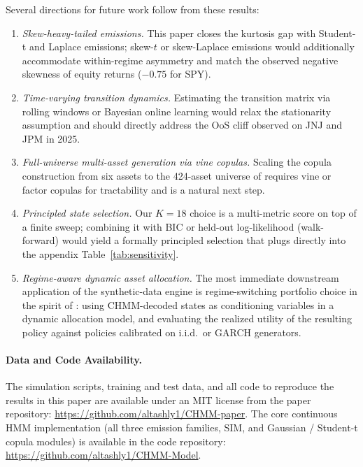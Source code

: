Several directions for future work follow from these results:
\begin{enumerate}
    \item \textit{Skew-heavy-tailed emissions.}
    This paper closes the kurtosis gap with Student-t and Laplace emissions; skew-$t$ or skew-Laplace emissions would additionally accommodate within-regime asymmetry and match the observed negative skewness of equity returns ($-0.75$ for SPY).

    \item \textit{Time-varying transition dynamics.}
    Estimating the transition matrix via rolling windows or Bayesian online learning would relax the stationarity assumption and should directly address the OoS cliff observed on JNJ and JPM in 2025.

    \item \textit{Full-universe multi-asset generation via vine copulas.}
    Scaling the copula construction from six assets to the 424-asset universe of \citet{alswaidan2026hybrid} requires vine or factor copulas for tractability and is a natural next step.

    \item \textit{Principled state selection.}
    Our $K = 18$ choice is a multi-metric score on top of a finite sweep; combining it with BIC or held-out log-likelihood (walk-forward) would yield a formally principled selection that plugs directly into the appendix Table~\ref{tab:sensitivity}.

    \item \textit{Regime-aware dynamic asset allocation.}
    The most immediate downstream application of the synthetic-data engine is regime-switching portfolio choice in the spirit of \citet{baekimmulvey2014}: using CHMM-decoded states as conditioning variables in a dynamic allocation model, and evaluating the realized utility of the resulting policy against policies calibrated on i.i.d.\ or GARCH generators.
\end{enumerate}

\paragraph{Data and Code Availability.}
The simulation scripts, training and test data, and all code to reproduce the results in this paper are available under an MIT license from the paper repository: \url{https://github.com/altashly1/CHMM-paper}.
The core continuous HMM implementation (all three emission families, SIM, and Gaussian / Student-t copula modules) is available in the code repository: \url{https://github.com/altashly1/CHMM-Model}.


